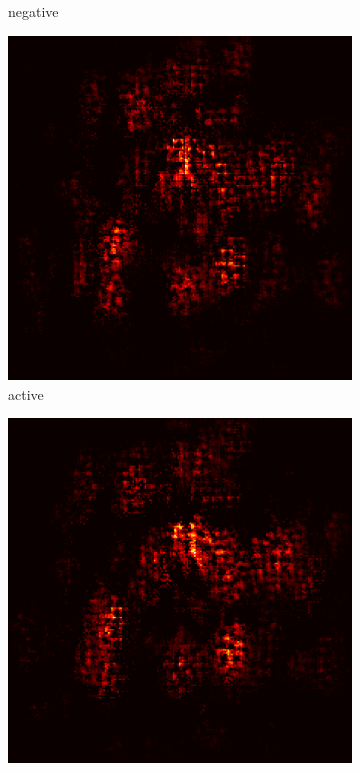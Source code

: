 \documentclass[preprint,12pt]{elsarticle}
\begin{document}
\begin{figure}
\begin{subfigure}{0.14\textwidth}
        \caption{negative}
    \end{subfigure}
    \hfill
    \begin{subfigure}{0.14\textwidth}
        \centering
        \includegraphics[width=\linewidth]{../visualizations/examples/imagenette/cnn/active_saliency_map/5.png}
        \caption{active}
    \end{subfigure}
    \hfill
    \begin{subfigure}{0.14\textwidth}
        \centering
        \includegraphics[width=\linewidth]{../visualizations/examples/imagenette/cnn/inactive_saliency_map/5.png}

\end{subfigure}
\end{figure}
\end{document}
